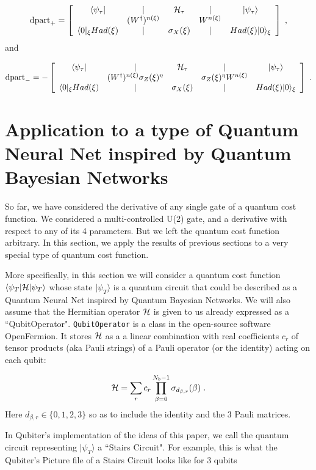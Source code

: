 \documentclass[12pt]{article}
\newcommand{\bra}[1]{\langle#1|}
\newcommand{\ket}[1]{|#1\rangle}
\newcommand{\beq}{\begin{equation}}
\newcommand{\eeq}{\end{equation}}
\newcommand{\hh}{{\cal H}}
\begin{document}
{\beq
{\rm dpart}_+=
\left[
\begin{array}{ccccc}
\bra{\psi_\tau}
&\mid&\hh_\tau &\mid&\ket{\psi_\tau}\\
&(W^\dag)^{n(\xi)}&&W^{n(\xi)}&\\
\bra{0}_\xi
Had(\xi)&\mid&\sigma_X(\xi)&\mid&Had(\xi)\ket{0}_\xi
\end{array}
\right]
\;,
\eeq
and

\beq
{\rm dpart}_-=
-\left[
\begin{array}{ccccc}
\bra{\psi_\tau}
&\mid&\hh_\tau &\mid&\ket{\psi_\tau}\\
&(W^\dag)^{n(\xi)}\sigma_Z(\xi)^\eta&&\sigma_Z(\xi)^\eta W^{n(\xi)}&\\
\bra{0}_\xi
Had(\xi)&\mid&\sigma_X(\xi)&\mid&Had(\xi)\ket{0}_\xi
\end{array}
\right]
\;.
\eeq


\section{Application to a type of
Quantum Neural Net inspired by
Quantum Bayesian Networks
}

So far, we have considered  the derivative
of any single gate of a quantum cost function.
We considered a multi-controlled U(2) gate,
and a derivative with respect to any of its 4 parameters.
But we left the
quantum cost function arbitrary.
In this section, we apply the results
of previous sections to a very special type of
quantum cost function.

More specifically, in
this section we will consider a quantum cost function
$\bra{\psi_T}\hh\ket{\psi_T}$
whose state $\ket{\psi_T}$
is a
quantum circuit
that could be described as a Quantum Neural Net inspired by
Quantum Bayesian Networks.
We will also assume that the Hermitian
operator $\hh$
is given to us already expressed as
 a ``QubitOperator". {\tt QubitOperator}
is a class
in the open-source software
OpenFermion. It
stores $\hh$ as a
a linear combination
 with real coefficients $c_r$
of tensor products
(aka Pauli strings) of a Pauli operator
(or the identity) acting on each qubit:

\beq
\hh = \sum_r c_r \prod_{\beta=0}^{N_b-1}
\sigma_{d_{\beta,r}}(\beta)
\;.
\label{eq_qbit_op}
\eeq
Here $d_{\beta,r} \in \{0,1,2,3\}$
so as to include the identity and the 3 Pauli matrices.



In Qubiter's
implementation of the
ideas of this paper,
we call the quantum
circuit representing $\ket{\psi_T}$
a ``Stairs
Circuit". For example, this is what the
Qubiter's Picture file of a Stairs Circuit
looks like for 3 qubits

}
\end{document}
